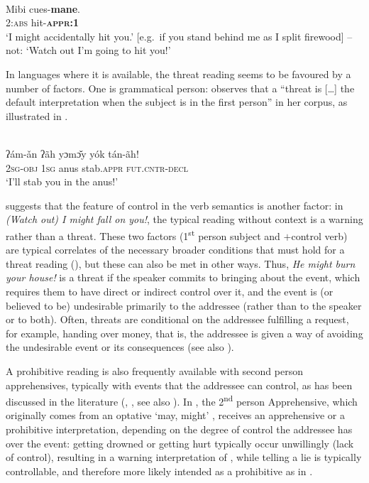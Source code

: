 \documentclass[output=paper,colorlinks,citecolor=brown]{langscibook}
\begin{document}
\ea \label{ex:intro21} 
\\
\gll Mibi cues-\textbf{mane}. \\
2:\textsc{abs} hit-\textsc{\textbf{appr:1}} \\
\glt `I might accidentally hit you.' [e.g.\  if you stand behind me as I split firewood] -- not: `Watch out I'm going to hit you!'
\z


In languages where it is available, the threat reading seems to be favoured by a number of factors. One is grammatical person: \citet[631]{epps2008} observes that a ``threat is [\ldots] the default interpretation when the subject is in the first person'' in her  corpus, as illustrated in .

\ea \label{ex:intro22}
\\
\gll ʔám-ǎn ʔãh yɔmɔ̌y yók tán-ãh! \\
\textsc{2sg-obj} \textsc{1sg} anus stab.\textsc{appr} \textsc{fut.cntr-decl} \\
\glt `I'll stab you in the anus!' 
\z


\citet[273--4]{vuillermet2018a} suggests that the feature of control in the verb semantics is another factor: in \textit{(Watch out) I might fall on you!}, the typical reading without context is a warning rather than a threat. These two factors (1\textsuperscript{st} person subject and $+$control verb) are typical correlates of the necessary broader conditions that must hold for a threat reading (\cite{searle-taxonomy,salgueiro2010}), but these can also be met in other ways. Thus, \textit{He might burn your house!} is a threat if the speaker commits to bringing about the event, which requires them to have direct or indirect control over it, and the event is (or believed to be) undesirable primarily to the addressee (rather than to the speaker or to both). Often, threats are conditional on the addressee fulfilling a request, for example, handing over money, that is, the addressee is given a way of avoiding the undesirable event or its consequences (see also \citealt{chapters/fedotov}).

A prohibitive reading is also frequently available with second person apprehensives, typically with events that the addressee can control, as has been discussed in the literature (\cite[57]{Dobrushina2006}, \cite{pakendorfschalley2007}, see also \citealt{chapters/wiemer}). In , the 2\textsuperscript{nd} person Apprehensive, which originally comes from an optative `may, might' \citep[193]{pitkin1984}, receives an apprehensive or a prohibitive interpretation, depending on the degree of control the addressee has over the event: getting drowned or getting hurt typically occur unwillingly (lack of control), resulting in a warning interpretation of , while telling a lie is typically controllable, and therefore more likely intended as a prohibitive as in .
\end{document}

